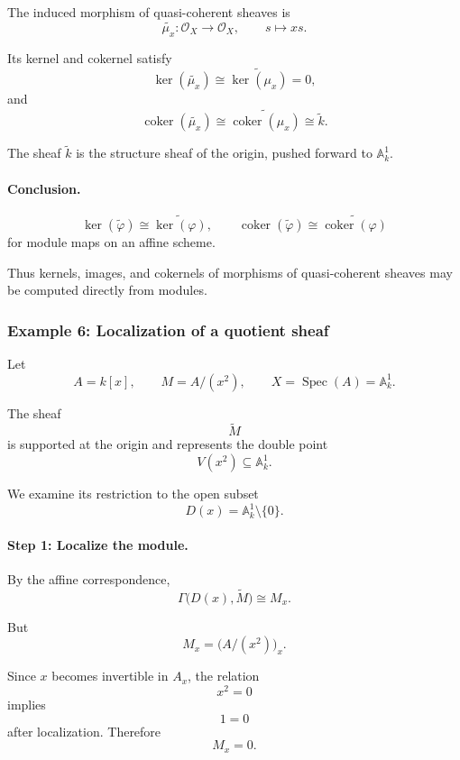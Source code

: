 \documentclass[12pt,a4paper]{article}
\theoremstyle{notespace}
\begin{document}
The induced morphism of quasi-coherent sheaves is
\[
\widetilde{\mu_{x}}:
\mathcal{O}_{X}
\longrightarrow
\mathcal{O}_{X},
\qquad
s\longmapsto xs.
\]

Its kernel and cokernel satisfy
\[
\ker(\widetilde{\mu_{x}})
\cong
\widetilde{\ker(\mu_{x})}
=
0,
\]
and
\[
\operatorname{coker}(\widetilde{\mu_{x}})
\cong
\widetilde{\operatorname{coker}(\mu_{x})}
\cong
\widetilde{k}.
\]

The sheaf \(\widetilde{k}\) is the structure sheaf of the origin, pushed
forward to \(\mathbb{A}^{1}_{k}\).

\paragraph{Conclusion.}

\[
\boxed{
	\ker(\widetilde{\varphi})
	\cong
	\widetilde{\ker(\varphi)},
	\qquad
	\operatorname{coker}(\widetilde{\varphi})
	\cong
	\widetilde{\operatorname{coker}(\varphi)}
}
\]
for module maps on an affine scheme.

Thus kernels, images, and cokernels of morphisms of quasi-coherent sheaves
may be computed directly from modules.

\subsubsection{Example 6: Localization of a quotient sheaf}

Let
\[
A=k[x],
\qquad
M=A/(x^{2}),
\qquad
X=\operatorname{Spec}(A)=\mathbb{A}^{1}_{k}.
\]

The sheaf
\[
\widetilde{M}
\]
is supported at the origin and represents the double point
\[
V(x^{2})\subseteq \mathbb{A}^{1}_{k}.
\]

We examine its restriction to the open subset
\[
D(x)=\mathbb{A}^{1}_{k}\setminus\{0\}.
\]

\paragraph{Step 1: Localize the module.}

By the affine correspondence,
\[
\Gamma\bigl(D(x),\widetilde{M}\bigr)
\cong
M_{x}.
\]

But
\[
M_{x}
=
\bigl(A/(x^{2})\bigr)_{x}.
\]

Since \(x\) becomes invertible in \(A_{x}\), the relation
\[
x^{2}=0
\]
implies
\[
1=0
\]
after localization. Therefore
\[
M_{x}=0.
\]
\end{document}
